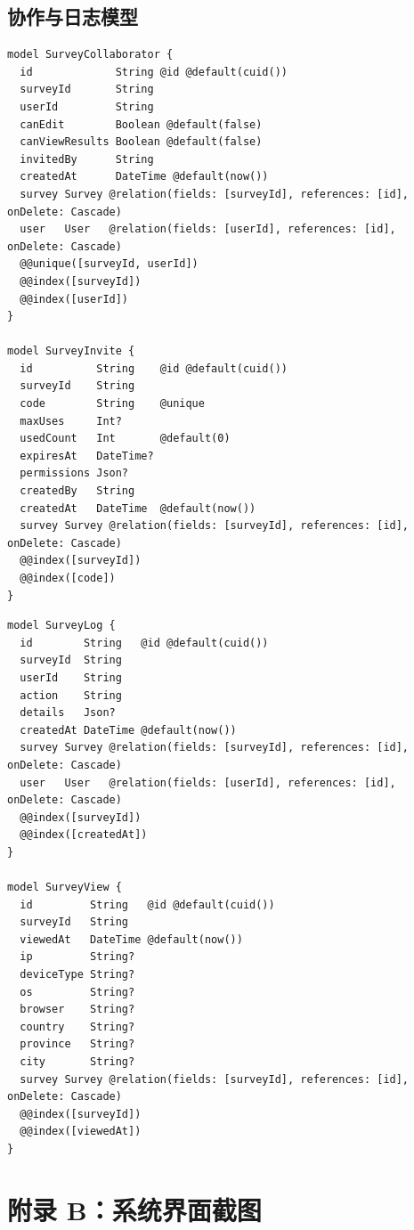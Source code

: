 \clearpage
\subsection{协作与日志模型}

\begin{verbatim}
model SurveyCollaborator {
  id             String @id @default(cuid())
  surveyId       String
  userId         String
  canEdit        Boolean @default(false)
  canViewResults Boolean @default(false)
  invitedBy      String
  createdAt      DateTime @default(now())
  survey Survey @relation(fields: [surveyId], references: [id], onDelete: Cascade)
  user   User   @relation(fields: [userId], references: [id], onDelete: Cascade)
  @@unique([surveyId, userId])
  @@index([surveyId])
  @@index([userId])
}

model SurveyInvite {
  id          String    @id @default(cuid())
  surveyId    String
  code        String    @unique
  maxUses     Int?
  usedCount   Int       @default(0)
  expiresAt   DateTime?
  permissions Json?
  createdBy   String
  createdAt   DateTime  @default(now())
  survey Survey @relation(fields: [surveyId], references: [id], onDelete: Cascade)
  @@index([surveyId])
  @@index([code])
}
\end{verbatim}

\begin{verbatim}
model SurveyLog {
  id        String   @id @default(cuid())
  surveyId  String
  userId    String
  action    String
  details   Json?
  createdAt DateTime @default(now())
  survey Survey @relation(fields: [surveyId], references: [id], onDelete: Cascade)
  user   User   @relation(fields: [userId], references: [id], onDelete: Cascade)
  @@index([surveyId])
  @@index([createdAt])
}

model SurveyView {
  id         String   @id @default(cuid())
  surveyId   String
  viewedAt   DateTime @default(now())
  ip         String?
  deviceType String?
  os         String?
  browser    String?
  country    String?
  province   String?
  city       String?
  survey Survey @relation(fields: [surveyId], references: [id], onDelete: Cascade)
  @@index([surveyId])
  @@index([viewedAt])
}
\end{verbatim}

\newpage
\section{附录 B：系统界面截图}

